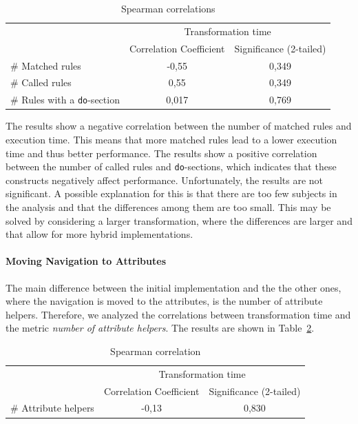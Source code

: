 \documentclass[12pt]{elsarticle}
\begin{document}
\begin{table}[hbt] \centering\small
\begin{tabular}{|l|c|c|}
\cline{2-3}
\multicolumn{1}{c|}{}               & \multicolumn{2}{c|}{Transformation time}          \\
\cline{2-3}
\multicolumn{1}{c|}{}               & Correlation Coefficient & Significance (2-tailed) \\
\hline
\# Matched rules                    & -0,55 & 0,349  \\
\hline
\# Called rules                     & 0,55  & 0,349 \\
\hline
\# Rules with a \texttt{do}-section & 0,017 & 0,769 \\
\hline
\end{tabular}
\normalsize
\caption{Spearman correlations}
\label{tab:cor:dec_vs_imp}
\end{table}


The results show a negative correlation between the number of matched rules and
execution time. This means that more matched rules lead to a lower execution
time and thus better performance. The results show a positive correlation
between the number of called rules and \texttt{do}-sections, which indicates
that these constructs negatively affect performance. Unfortunately, the results
are not significant. A possible explanation for this is that there are too few
subjects in the analysis and that the differences among them are too small. This
may be solved by considering a larger transformation, where the differences are
larger and that allow for more hybrid implementations.

\paragraph{Moving Navigation to Attributes}
The main difference between the initial implementation and the the other ones,
where the navigation is moved to the attributes, is the number of attribute
helpers. Therefore, we analyzed the correlations between transformation time and
the metric \emph{number of attribute helpers}. The results are shown in
Table~\ref{tab:cor:mov_nav_to_attr}.\\

\begin{table}[tb] \centering\small
\begin{tabular}{|l|c|c|}
\cline{2-3}
\multicolumn{1}{c|}{}               & \multicolumn{2}{c|}{Transformation time}          \\
\cline{2-3}
\multicolumn{1}{c|}{}               & Correlation Coefficient & Significance (2-tailed) \\
\hline
\# Attribute helpers                & -0,13 & 0,830  \\
\hline
\end{tabular}
\normalsize
\caption{Spearman correlation}
\label{tab:cor:mov_nav_to_attr}
\end{table}
\end{document}
